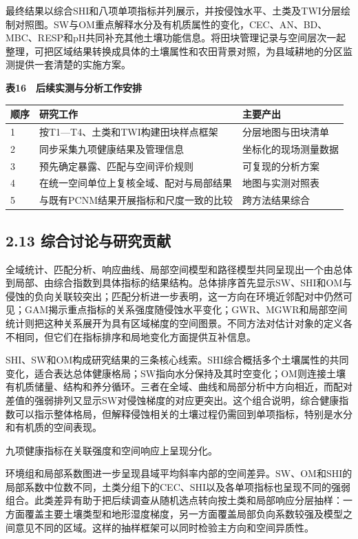 \documentclass[
  11pt,
  a4paper,
]{ctexart}
\begin{document}
最终结果以综合SHI和八项单项指标并列展示，并按侵蚀水平、土类及TWI分层绘制对照图。SW与OM重点解释水分及有机质属性的变化，CEC、AN、BD、MBC、RESP和pH共同补充其他土壤功能信息。将田块管理记录与空间层次一起整理，可把区域结果转换成具体的土壤属性和农田背景对照，为县域耕地的分区监测提供一套清楚的实施方案。

\textbf{表16　后续实测与分析工作安排}

\begin{longtable}[]{@{}lll@{}}
\toprule
顺序 & 研究工作 & 主要产出 \\
\midrule
\endhead
1 & 按T1---T4、土类和TWI构建田块样点框架 & 分层地图与田块清单 \\
2 & 同步采集九项健康结果及管理信息 & 坐标化的现场测量数据 \\
3 & 预先确定暴露、匹配与空间评价规则 & 可复现的分析方案 \\
4 & 在统一空间单位上复核全域、配对与局部结果 & 地图与实测对照表 \\
5 & 与既有PCNM结果开展指标和尺度一致的比较 & 跨方法结果综合 \\
\bottomrule
\end{longtable}

\hypertarget{ux7efcux5408ux8ba8ux8bbaux4e0eux7814ux7a76ux8d21ux732e}{%
\subsection{2.13
综合讨论与研究贡献}\label{ux7efcux5408ux8ba8ux8bbaux4e0eux7814ux7a76ux8d21ux732e}}

全域统计、匹配分析、响应曲线、局部空间模型和路径模型共同呈现出一个由总体到局部、由综合指数到具体指标的结果结构。总体排序首先显示SW、SHI和OM与侵蚀的负向关联较突出；匹配分析进一步表明，这一方向在环境近邻配对中仍然可见；GAM揭示重点指标的关系强度随侵蚀水平变化；GWR、MGWR和局部空间统计则把这种关系展开为具有区域梯度的空间图景。不同方法对估计对象的定义各不相同，但它们在指标排序和局地变化方面提供互补信息。

SHI、SW和OM构成研究结果的三条核心线索。SHI综合概括多个土壤属性的共同变化，适合表达总体健康格局；SW指向水分保持及其时空变化；OM则连接土壤有机质储量、结构和养分循环。三者在全域、曲线和局部分析中方向相近，而配对差值的强弱排列又显示SW对侵蚀梯度的对应更突出。这个组合说明，综合健康指数可以指示整体格局，但解释侵蚀相关的土壤过程仍需回到单项指标，特别是水分和有机质的空间表现。

九项健康指标在关联强度和空间响应上呈现分化。

环境组和局部系数图进一步呈现县域平均斜率内部的空间差异。SW、OM和SHI的局部系数中位数不同，土类分组下的CEC、SHI以及各单项指标也呈现不同的强弱组合。此类差异有助于把后续调查从随机选点转向按土类和局部响应分层抽样：一方面覆盖主要土壤类型和地形湿度梯度，另一方面覆盖局部负向系数较强及模型之间意见不同的区域。这样的抽样框架可以同时检验主方向和空间异质性。
\end{document}
